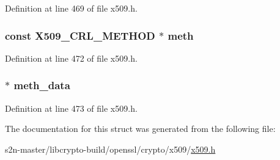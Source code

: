 Definition at line 469 of file x509.\+h.

\subsubsection[{\texorpdfstring{meth}{meth}}]{\setlength{\rightskip}{0pt plus 5cm}const {\bf X509\+\_\+\+C\+R\+L\+\_\+\+M\+E\+T\+H\+OD} $\ast$ meth}\hypertarget{struct_x509__crl__st_a28e28c5c76d9e1ee6debacf618e06fc2}{}\label{struct_x509__crl__st_a28e28c5c76d9e1ee6debacf618e06fc2}


Definition at line 472 of file x509.\+h.

\subsubsection[{\texorpdfstring{meth\+\_\+data}{meth_data}}]{ $\ast$ meth\+\_\+data}\hypertarget{struct_x509__crl__st_abb3014ed4d11f8b0d1e88bc8ba42fd83}{}\label{struct_x509__crl__st_abb3014ed4d11f8b0d1e88bc8ba42fd83}


Definition at line 473 of file x509.\+h.



The documentation for this struct was generated from the following file\+:\begin{DoxyCompactItemize}
\item 
s2n-\/master/libcrypto-\/build/openssl/crypto/x509/\hyperlink{crypto_2x509_2x509_8h}{x509.\+h}\end{DoxyCompactItemize}
